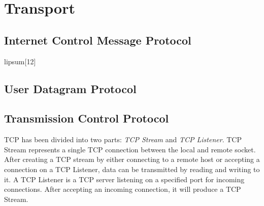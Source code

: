 \section{Transport}
\lipsum[11]
\subsection{Internet Control Message Protocol}
lipsum[12]
\subsection{User Datagram Protocol}
\lipsum[13]
\subsection{Transmission Control Protocol}
TCP has been divided into two parts: \emph{TCP Stream} and \emph{TCP Listener}. TCP Stream represents a single TCP connection between the local and remote socket. After creating a TCP stream by either connecting to a remote host or accepting a connection on a TCP Listener, data can be transmitted by reading and writing to it. A TCP Listener is a TCP server listening on a specified port for incoming connections. After accepting an incoming connection, it will produce a TCP Stream.

